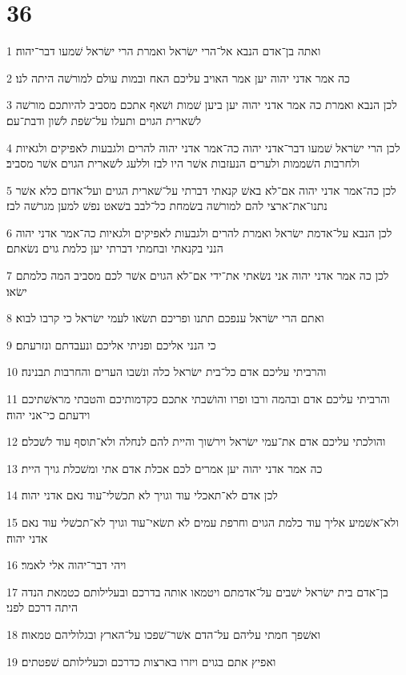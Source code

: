 \chapter{36}

\par 1 ואתה בן־אדם הנבא אל־הרי ישׂראל ואמרת הרי ישׂראל שׁמעו דבר־יהוה׃
\par 2 כה אמר אדני יהוה יען אמר האויב עליכם האח ובמות עולם למורשׁה היתה לנו׃
\par 3 לכן הנבא ואמרת כה אמר אדני יהוה יען ביען שׁמות ושׁאף אתכם מסביב להיותכם מורשׁה לשׁארית הגוים ותעלו על־שׂפת לשׁון ודבת־עם׃
\par 4 לכן הרי ישׂראל שׁמעו דבר־אדני יהוה כה־אמר אדני יהוה להרים ולגבעות לאפיקים ולגאיות ולחרבות השׁממות ולערים הנעזבות אשׁר היו לבז וללעג לשׁארית הגוים אשׁר מסביב׃
\par 5 לכן כה־אמר אדני יהוה אם־לא באשׁ קנאתי דברתי על־שׁארית הגוים ועל־אדום כלא אשׁר נתנו־את־ארצי להם למורשׁה בשׂמחת כל־לבב בשׁאט נפשׁ למען מגרשׁה לבז׃
\par 6 לכן הנבא על־אדמת ישׂראל ואמרת להרים ולגבעות לאפיקים ולגאיות כה־אמר אדני יהוה הנני בקנאתי ובחמתי דברתי יען כלמת גוים נשׂאתם׃
\par 7 לכן כה אמר אדני יהוה אני נשׂאתי את־ידי אם־לא הגוים אשׁר לכם מסביב המה כלמתם ישׂאו׃
\par 8 ואתם הרי ישׂראל ענפכם תתנו ופריכם תשׂאו לעמי ישׂראל כי קרבו לבוא׃
\par 9 כי הנני אליכם ופניתי אליכם ונעבדתם ונזרעתם׃
\par 10 והרביתי עליכם אדם כל־בית ישׂראל כלה ונשׁבו הערים והחרבות תבנינה׃
\par 11 והרביתי עליכם אדם ובהמה ורבו ופרו והושׁבתי אתכם כקדמותיכם והטבתי מראשׁתיכם וידעתם כי־אני יהוה׃
\par 12 והולכתי עליכם אדם את־עמי ישׂראל וירשׁוך והיית להם לנחלה ולא־תוסף עוד לשׁכלם׃
\par 13 כה אמר אדני יהוה יען אמרים לכם אכלת אדם אתי ומשׁכלת גויך היית׃
\par 14 לכן אדם לא־תאכלי עוד וגויך לא תכשׁלי־עוד נאם אדני יהוה׃
\par 15 ולא־אשׁמיע אליך עוד כלמת הגוים וחרפת עמים לא תשׂאי־עוד וגויך לא־תכשׁלי עוד נאם אדני יהוה׃
\par 16 ויהי דבר־יהוה אלי לאמר׃
\par 17 בן־אדם בית ישׂראל ישׁבים על־אדמתם ויטמאו אותה בדרכם ובעלילותם כטמאת הנדה היתה דרכם לפני׃
\par 18 ואשׁפך חמתי עליהם על־הדם אשׁר־שׁפכו על־הארץ ובגלוליהם טמאוה׃
\par 19 ואפיץ אתם בגוים ויזרו בארצות כדרכם וכעלילותם שׁפטתים׃
